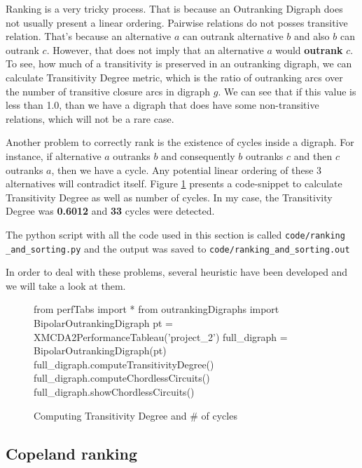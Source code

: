 \documentclass[a4paper]{article}
\begin{document}
Ranking is a very tricky process. That is because an Outranking Digraph does not usually present a linear ordering. Pairwise relations do not posses transitive relation. That's because an alternative $a$ can outrank alternative $b$ and also $b$ can outrank $c$. However, that does not imply that an alternative $a$ would \textbf{outrank} $c$. To see, how much of a transitivity is preserved in an outranking digraph, we can calculate Transitivity Degree metric, which is the ratio of outranking arcs over the number of transitive closure arcs in digraph $g$. We can see that if this value is less than 1.0, than we have a digraph that does have some non-transitive relations, which will not be a rare case.

Another problem to correctly rank is the existence of cycles inside a digraph. For instance, if alternative $a$ outranks $b$ and consequently $b$ outranks $c$ and then $c$ outranks $a$, then we have a cycle. Any potential linear ordering of these 3 alternatives will contradict itself. Figure \ref{lst:cycles} presents a code-snippet to calculate Transitivity Degree as well as number of cycles. In my case, the Transitivity Degree was \textbf{0.6012} and \textbf{33} cycles were detected.

The python script with all the code used in this section is called  \texttt{code/ranking\\\_and\_sorting.py} and the output was saved to \texttt{code/ranking\_and\_sorting.out}

In order to deal with these problems, several heuristic have been developed and we will take a look at them.

\begin{figure}[H]
	\begin{center}
		\begin{python}
from perfTabs import *
from outrankingDigraphs import BipolarOutrankingDigraph
pt = XMCDA2PerformanceTableau('project_2')
full_digraph = BipolarOutrankingDigraph(pt)
full_digraph.computeTransitivityDegree()
full_digraph.computeChordlessCircuits()
full_digraph.showChordlessCircuits()
		\end{python}
	\end{center}
	\caption{Computing Transitivity Degree and $\#$ of cycles}
	\label{lst:cycles}
\end{figure}


\subsection{Copeland ranking}
\label{sec:copeland} 
\end{document}
